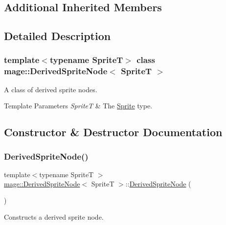 \subsection*{Additional Inherited Members}


\subsection{Detailed Description}
\subsubsection*{template$<$typename SpriteT$>$\newline
class mage\+::\+Derived\+Sprite\+Node$<$ Sprite\+T $>$}

A class of derived sprite nodes.


\begin{DoxyTemplParams}{Template Parameters}
{\em SpriteT} & The \hyperlink{classmage_1_1_sprite}{Sprite} type. \\
\hline
\end{DoxyTemplParams}


\subsection{Constructor \& Destructor Documentation}
\hypertarget{classmage_1_1_derived_sprite_node_a535c0a655a02c414d05596a3959e26d9}{}\label{classmage_1_1_derived_sprite_node_a535c0a655a02c414d05596a3959e26d9} 
\subsubsection{\texorpdfstring{Derived\+Sprite\+Node()}{DerivedSpriteNode()}\hspace{0.1cm}{\footnotesize\ttfamily [1/3]}}
{\footnotesize\ttfamily template$<$typename SpriteT $>$ \\
\hyperlink{classmage_1_1_derived_sprite_node}{mage\+::\+Derived\+Sprite\+Node}$<$ SpriteT $>$\+::\hyperlink{classmage_1_1_derived_sprite_node}{Derived\+Sprite\+Node} (\begin{DoxyParamCaption}{ }\end{DoxyParamCaption})}

Constructs a derived sprite node. \hypertarget{classmage_1_1_derived_sprite_node_af0e8a99b4fb15fd71f4c642999fed2cf}{}\label{classmage_1_1_derived_sprite_node_af0e8a99b4fb15fd71f4c642999fed2cf} 
